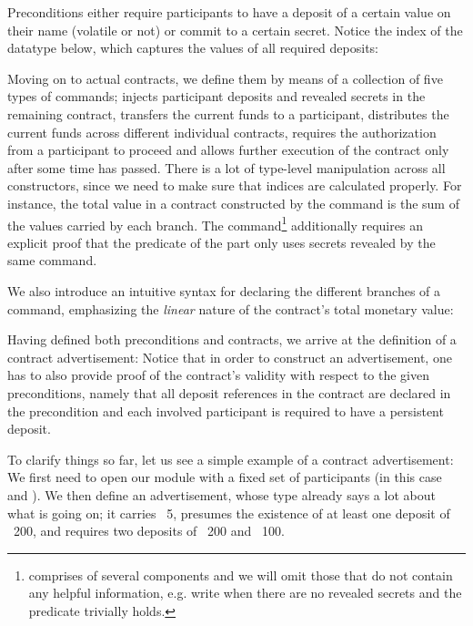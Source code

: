 \documentclass[acmsmall,nonacm=true,screen=true]{acmart}
\begin{document}
Preconditions either require participants to have a deposit of a certain value on their name (volatile or not) or 
commit to a certain secret. Notice the index of the datatype below, which captures the values of all required deposits:
\BITpreconditions{}

Moving on to actual contracts, we define them by means of a collection of five types of commands;
\inlinePut{} injects participant deposits and revealed secrets in the remaining contract,
\inlineWithdraw{} transfers the current funds to a participant,
\inlineSplit{} distributes the current funds across different individual contracts,
\inlineAuthDecoration{} requires the authorization from a participant to proceed
and \inlineTimeDecoration{} allows further execution of the contract only after some time has passed.
\BITcontracts{}
There is a lot of type-level manipulation across all constructors, since we need to make sure that indices are
calculated properly. For instance, the total value in a contract constructed by the \inlineSplit{} command is the 
sum of the values carried by each branch.
The \inlinePut{} command\footnote{
\inlinePut{} comprises of several components and we will omit those that do not contain any helpful information,
e.g. write \inlineSimplePut{} when there are no revealed secrets and the predicate trivially holds.
} additionally requires an explicit proof that the predicate
of the \inlineIf{} part only uses secrets revealed by the same command.

We also introduce an intuitive syntax for declaring the different branches of a \inlineSplit{} command, emphasizing the
\textit{linear} nature of the contract's total monetary value:
\BITlollipop{}

Having defined both preconditions and contracts, we arrive at the definition of a contract advertisement:
\BITadvertisements{}
Notice that in order to construct an advertisement, one has to also provide proof of the contract's validity with respect to
the given preconditions, namely that all deposit references in the contract are declared in the precondition
and each involved participant is required to have a persistent deposit.

To clarify things so far, let us see a simple example of a contract advertisement:
\BITexampleAdvertisement{}
We first need to open our module with a fixed set of participants (in this case \inlineA{} and \inlineB{}).
We then define an advertisement, whose type already says a lot about what is going on;
it carries \bitcoin ~5, presumes the existence of at least one deposit of \bitcoin ~200, and requires two deposits
of \bitcoin ~200 and \bitcoin ~100.
\end{document}
